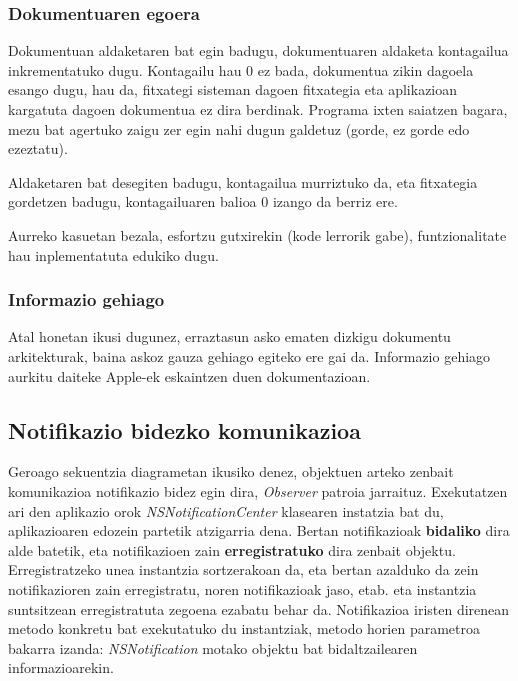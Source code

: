 \subsubsection{Dokumentuaren egoera}
Dokumentuan aldaketaren bat egin badugu, dokumentuaren aldaketa kontagailua inkrementatuko dugu. Kontagailu hau 0 ez bada, dokumentua zikin dagoela esango dugu, hau da, fitxategi sisteman dagoen fitxategia eta aplikazioan kargatuta dagoen dokumentua ez dira berdinak. Programa ixten saiatzen bagara, mezu bat agertuko zaigu zer egin nahi dugun galdetuz (gorde, ez gorde edo ezeztatu).

Aldaketaren bat desegiten badugu, kontagailua murriztuko da, eta fitxategia gordetzen badugu, kontagailuaren balioa 0 izango da berriz ere.

Aurreko kasuetan bezala, esfortzu gutxirekin (kode lerrorik gabe), funtzionalitate hau inplementatuta edukiko dugu.

\subsubsection{Informazio gehiago}
Atal honetan ikusi dugunez, erraztasun asko ematen dizkigu dokumentu arkitekturak, baina askoz gauza gehiago egiteko ere gai da. Informazio gehiago aurkitu daiteke Apple-ek eskaintzen duen dokumentazioan\cite{ap:dba}.

\subsection{Notifikazio bidezko komunikazioa}
Geroago sekuentzia diagrametan ikusiko denez, objektuen arteko zenbait komunikazioa notifikazio bidez egin dira, \textit{Observer} patroia jarraituz. Exekutatzen ari den aplikazio orok \textit{NSNotificationCenter} klasearen instatzia bat du, aplikazioaren edozein partetik atzigarria dena. Bertan notifikazioak \textbf{bidaliko} dira alde batetik, eta notifikazioen zain \textbf{erregistratuko} dira zenbait objektu. Erregistratzeko unea instantzia sortzerakoan da, eta bertan azalduko da zein notifikazioren zain erregistratu, noren notifikazioak jaso, etab. eta instantzia suntsitzean erregistratuta zegoena ezabatu behar da. Notifikazioa iristen direnean metodo konkretu bat exekutatuko du instantziak, metodo horien parametroa bakarra izanda: \textit{NSNotification} motako objektu bat bidaltzailearen informazioarekin.
 
